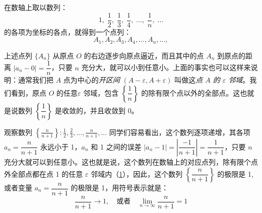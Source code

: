 \begin{example}
在数轴上取以数列：
\[1,\; \frac{1}{2},\;\frac{1}{3},\;\frac{1}{4},\; \ldots,\;\frac{1}{n},\;\ldots\]
的各项为坐标的各点，就得到一个点列：
\[A_1,A_2,A_3,A_4,\ldots,A_n,\ldots,\]
{\linespread{1.6}\selectfont 上述点列 $\{A_n\}$ 从原点 $O$ 的右边逐步向原点逼近，而且其中的点 $A_n$ 到原点的距离 $|a_n-0|=\dfrac{1}{n}$，只要 $n$ 充分大，就可以小到任意小。上面的事实也可以这样来说明：通常我们把 $A$ 点为中心的\emph{开区间} $(A-\varepsilon,A+\varepsilon)$ 叫做这\emph{点 $A$ 的 $\varepsilon$ 邻域}。我们看到，原点 $O$ 的任意$\varepsilon$ 邻域，包含 $\left\{\dfrac{1}{n}\right\}$ 的除有限个点以外的全部点。这也就是说数列 $\left\{\dfrac{1}{n}\right\}$ 是收敛的，并且收敛到 0。\par}
\end{example}

\begin{example}\label{exp:converge}
\linespread{1.6}\selectfont
观察数列 $\displaystyle \left\{\frac{n}{n+1}\right\}: \frac{1}{2},\frac{2}{3},\ldots,\frac{n}{n+1},\ldots$ 同学们容易看出，这个数列逐项递增，其各项 $a_n=\dfrac{n}{n+1}$ 永远小于 1，$a_n$ 和 1 之间的误差 $|a_n-1|=\left|\dfrac{-1}{n+1}\right|=\dfrac{1}{n+1}$，只要 $n$ 充分大就可以到任意小。这也就是说，这个数列在数轴上的对应点列，除有限个点外全部点都在点 1 的任意 $\varepsilon$ 邻域内（\cref{fig:limits}），因此，这个数列 $\left\{\dfrac{n}{n+1}\right\}$ 的极限是 1, 或者变量 $a_n=\dfrac{n}{n+1}$ 的极限是 1，用符号表示就是：
\[\frac{n}{n+1}\to 1,\quad \text{或者}\quad \lim_{n\to\infty}\frac{n}{n+1}=1\]
\begin{figure}
    \caption{}\label{fig:limits}
\end{figure}
\end{example}

